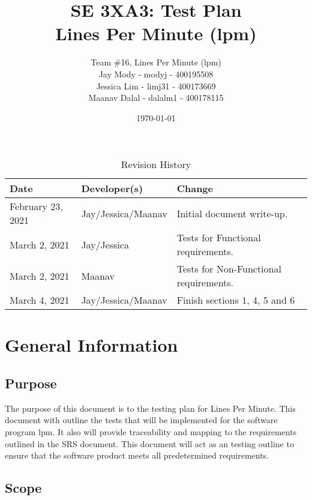 \documentclass[12pt, titlepage]{article}
\title{\textbf{SE 3XA3: Test Plan}\\Lines Per Minute (lpm)}
\author{Team \#16, Lines Per Minute (lpm)\\
Jay Mody - modyj - 400195508\\
Jessica Lim - limj31 - 400173669\\
Maanav Dalal - dalalm1 - 400178115\\
}
\date{\today}
\begin{document}
\maketitle
\begin{table}[hp]
\caption{Revision History} \label{TblRevisionHistory}
\begin{tabularx}{\textwidth}{llX}
\toprule
\textbf{Date} & \textbf{Developer(s)} & \textbf{Change}\\
\midrule
February 23, 2021 & Jay/Jessica/Maanav & Initial document write-up. \\
March 2, 2021 & Jay/Jessica & Tests for Functional requirements. \\
March 2, 2021 & Maanav & Tests for Non-Functional requirements. \\
March 4, 2021 & Jay/Jessica/Maanav & Finish sections 1, 4, 5 and 6 \\
\bottomrule
\end{tabularx}
\end{table}

\newpage

\maketitle

\tableofcontents
\listoftables

\newpage


\section{General Information}

\subsection{Purpose}

The purpose of this document is to the testing plan for Lines Per Minute. This document with outline the tests that will be implemented for the software program lpm. It also will provide traceability and mapping to the requirements outlined in the SRS document. This document will act as an testing outline to ensure that the software product meets all predetermined requirements.

\subsection{Scope}
\end{document}
